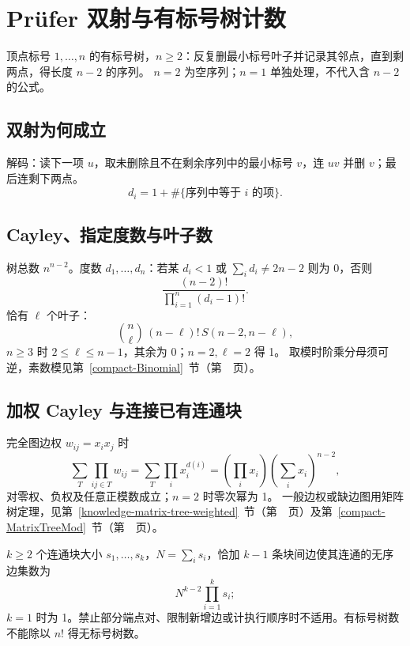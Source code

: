 \section{Prüfer 双射与有标号树计数}\label{knowledge-prufer}
顶点标号 $1,\ldots,n$ 的有标号树，$n\ge2$：反复删最小标号叶子并记录其邻点，直到剩两点，得长度 $n-2$ 的序列。
$n=2$ 为空序列；$n=1$ 单独处理，不代入含 $n-2$ 的公式。

\subsection{双射为何成立}
解码：读下一项 $u$，取未删除且不在剩余序列中的最小标号 $v$，连 $uv$ 并删 $v$；最后连剩下两点。
\[
 d_i=1+\#\{\text{序列中等于 }i\text{ 的项}\}.
\]

\subsection{Cayley、指定度数与叶子数}
树总数 $n^{n-2}$。度数 $d_1,\ldots,d_n$：若某 $d_i<1$ 或 $\sum_id_i\ne2n-2$ 则为 0，否则
\[
 \frac{(n-2)!}{\prod_{i=1}^n(d_i-1)!}.
\]
恰有 $\ell$ 个叶子：
\[
 \binom n\ell\,(n-\ell)!\,S(n-2,n-\ell),
\]
$n\ge3$ 时 $2\le\ell\le n-1$，其余为 0；$n=2,\ell=2$ 得 1。
取模时阶乘分母须可逆，素数模见第~\ref{compact-Binomial}~节（第~\pageref{compact-Binomial}~页）。

\clearpage
\subsection{加权 Cayley 与连接已有连通块}
完全图边权 $w_{ij}=x_ix_j$ 时
\[
 \sum_T\prod_{ij\in T}w_{ij}
 =\sum_T\prod_i x_i^{d(i)}
 =\left(\prod_i x_i\right)\left(\sum_i x_i\right)^{n-2},
\]
对零权、负权及任意正模数成立；$n=2$ 时零次幂为 1。
一般边权或缺边图用矩阵树定理，见第~\ref{knowledge-matrix-tree-weighted}~节（第~\pageref{knowledge-matrix-tree-weighted}~页）及第~\ref{compact-MatrixTreeMod}~节（第~\pageref{compact-MatrixTreeMod}~页）。

$k\ge2$ 个连通块大小 $s_1,\ldots,s_k$，$N=\sum_is_i$，恰加 $k-1$ 条块间边使其连通的无序边集数为
\[
 N^{k-2}\prod_{i=1}^k s_i;
\]
$k=1$ 时为 1。禁止部分端点对、限制新增边或计执行顺序时不适用。有标号树数不能除以 $n!$ 得无标号树数。
